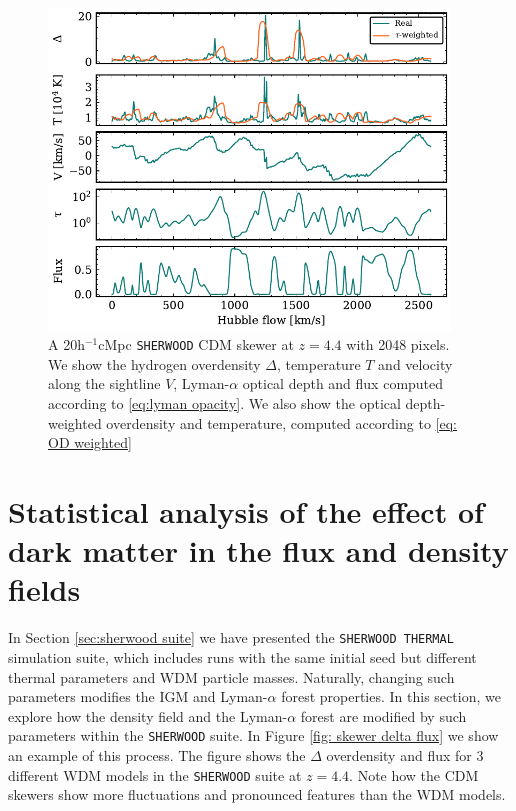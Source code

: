 \begin{figure}
        \centering
        \includegraphics[width=0.95\textwidth]{img/ML/Skewer_OD_quantities.pdf}
        \caption{A 20h$^{-1}$cMpc \texttt{SHERWOOD} CDM skewer at $z=4.4$ with 2048 pixels. We show the hydrogen overdensity $\Delta$, temperature $T$ and velocity along the sightline $V$, Lyman-$\alpha$ optical depth and flux computed according to \ref{eq:lyman opacity}. We also show the optical depth-weighted overdensity and temperature, computed according to \ref{eq: OD weighted}}
        \label{fig: skewer sherwood}     
\end{figure}













\section{Statistical analysis of the effect of dark matter in the flux and density fields}\label{sec:statistics sher}


In Section \ref{sec:sherwood suite} we have presented the \texttt{SHERWOOD THERMAL} simulation suite, which includes runs with the same initial seed but different thermal parameters and WDM particle masses. Naturally, changing such parameters modifies the IGM and Lyman-$\alpha$ forest properties. In this section, we explore how the density field and the Lyman-$\alpha$ forest are modified by such parameters within the \texttt{SHERWOOD} suite. In Figure \ref{fig: skewer delta flux} we show an example of this process. The figure shows the $\Delta$ overdensity and flux for 3 different WDM models in the \texttt{SHERWOOD} suite at $z=4.4$. Note how the CDM skewers show more fluctuations and pronounced features than the WDM models.

